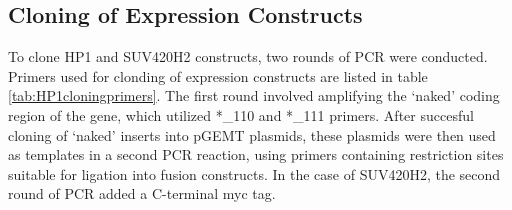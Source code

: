 \documentclass[onehalf,12pt]{beavtex}
\begin{document}
  \FloatBarrier
  
  \subsection{Cloning of Expression
  Constructs}\label{cloning-of-expression-constructs}
  
  To clone HP1 and SUV420H2 constructs, two rounds of PCR were conducted.
  Primers used for clonding of expression constructs are listed in table
  \ref{tab:HP1cloningprimers}. The first round involved amplifying the
  `naked' coding region of the gene, which utilized *\_110 and *\_111
  primers. After succesful cloning of `naked' inserts into pGEMT plasmids,
  these plasmids were then used as templates in a second PCR reaction,
  using primers containing restriction sites suitable for ligation into
  fusion constructs. In the case of SUV420H2, the second round of PCR
  added a C-terminal myc tag.
  
\end{document}
